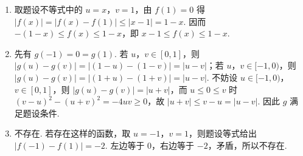 \begin{solution}
\begin{enumerate}
\item 取题设不等式中的 \(u=x\)，\(v=1\)，由 \(f(1)=0\) 得 \(|f(x)|=|f(x)-f(1)|\leqslant|x-1|=1-x\). 因而 \(-(1-x)\leqslant f(x)\leqslant1-x\)，即 \(x-1\leqslant f(x)\leqslant1-x\).
\item 先有 \(g(-1)=0=g(1)\). 若 \(u\)，\(v\in[0,1]\)，则 \(|g(u)-g(v)|=|(1-u)-(1-v)|=|u-v|\)；若 \(u\)，\(v\in[-1,0)\)，则 \(|g(u)-g(v)|=|(1+u)-(1+v)|=|u-v|\). 不妨设 \(u\in[-1,0)\)，\(v\in[0,1]\)，则 \(|g(u)-g(v)|=|u+v|\)，而 \(u\leqslant0\leqslant v\) 时 \((v-u)^2-(u+v)^2=-4uv\geqslant0\)，故 \(|u+v|\leqslant v-u=|u-v|\). 因此 \(g\) 满足题设条件.
\item 不存在. 若存在这样的函数，取 \(u=-1\)，\(v=1\)，则题设等式给出 \(|f(-1)-f(1)|=-2\). 左边等于 \(0\)，右边等于 \(-2\)，矛盾，所以不存在.
\end{enumerate}
\end{solution}
